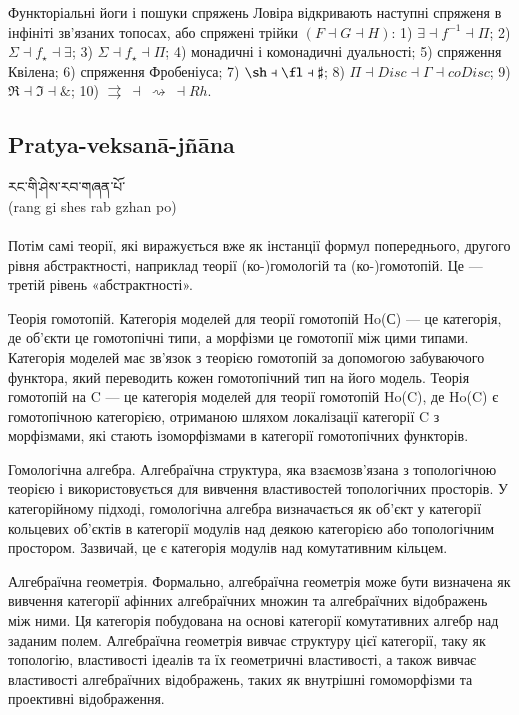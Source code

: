 Функторіальні йоги і пошуки спряжень Ловіра відкривають наступні
спряженя в інфініті зв'язаних топосах, або спряжені трійки $(F \dashv G \dashv H)$:
1) $\exists \dashv f^{-1} \dashv \Pi$;
2) $\Sigma \dashv f_\star \dashv \exists$;
3) $\Sigma \dashv f_\star \dashv \Pi$;
4) монадичні і комонадичні дуальності;
5) спряження Квілена;
6) спряження Фробеніуса;
7) $\sh \dashv \fl \dashv \sharp$;
8) $\Pi \dashv Disc \dashv \Gamma \dashv coDisc$;
9) $\Re \dashv \Im \dashv \&$;
10) $\rightrightarrows\ \dashv\ \rightsquigarrow\ \dashv Rh$. 

\newpage
\subsection*{Pratya-veksanā-jñāna}

\ti རང་གི་ཤེས་རབ་གཞན་པོ་ 
\\
\ua (rang gi shes rab gzhan po)\\
\\
Потім самі теорії, які виражується вже як інстанції формул попереднього,
другого рівня абстрактності, наприклад теорії (ко-)гомологій та (ко-)гомотопій.
Це --- третій рівень «абстрактності».

Теорія гомотопій. Категорія моделей для теорії гомотопій Ho(С) ---
це категорія, де об'єкти це гомотопічні типи, а морфізми це гомотопії
між цими типами. Категорія моделей має зв'язок з теорією гомотопій за
допомогою забуваючого функтора, який переводить кожен гомотопічний тип
на його модель. Теорія гомотопій на C --- це категорія моделей для теорії
гомотопій Ho(C), де Ho(C) є гомотопічною категорією, отриманою шляхом
локалізації категорії C з морфізмами, які стають ізоморфізмами в категорії
гомотопічних функторів.

Гомологічна алгебра. Алгебраїчна структура, яка взаємозв'язана з
топологічною теорією і використовується для вивчення властивостей
топологічних просторів. У категорійному підході, гомологічна алгебра
визначається як об'єкт у категорії кольцевих об'єктів в категорії модулів
над деякою категорією або топологічним простором. Зазвичай, це є категорія
модулів над комутативним кільцем.

Алгебраїчна геометрія. Формально, алгебраїчна геометрія може бути
визначена як вивчення категорії афінних алгебраїчних множин та алгебраїчних
відображень між ними. Ця категорія побудована на основі категорії
комутативних алгебр над заданим полем. Алгебраїчна геометрія вивчає
структуру цієї категорії, таку як топологію, властивості ідеалів та
їх геометричні властивості, а також вивчає властивості алгебраїчних
відображень, таких як внутрішні гомоморфізми та проективні відображення.

